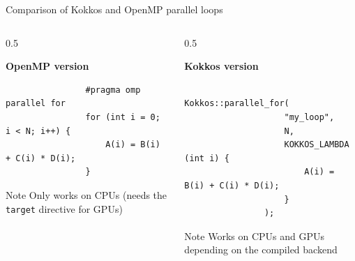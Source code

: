 \documentclass[
    aspectratio=169,
    \createHandout
]{beamer}
\begin{document}
\begin{frame}[fragile]{Comparison of Kokkos and OpenMP parallel loops}
    \begin{columns}[T]
        \begin{column}{0.5\linewidth}
            \begin{center}
                \textbf{OpenMP version}
            \end{center}
            \begin{verbatim}
                #pragma omp parallel for
                for (int i = 0; i < N; i++) {
                    A(i) = B(i) + C(i) * D(i);
                }
            \end{verbatim}
            \begin{block}{Note}
                Only works on CPUs (needs the \texttt{target} directive for GPUs)
            \end{block}
        \end{column}
        \pause
        \begin{column}{0.5\linewidth}
            \begin{center}
                \textbf{Kokkos version}
            \end{center}
            \begin{verbatim}
                Kokkos::parallel_for(
                    "my_loop",
                    N,
                    KOKKOS_LAMBDA (int i) {
                        A(i) = B(i) + C(i) * D(i);
                    }
                );
            \end{verbatim}

            \vspace{-0.75em}

            \begin{block}{Note}
                Works on CPUs and GPUs depending on the compiled backend
            \end{block}
        \end{column}
    \end{columns}
\end{frame}

\end{document}
